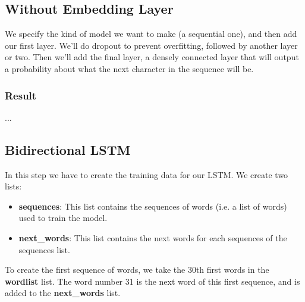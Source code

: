 \documentclass[conference]{IEEEtran}
\begin{document}
\subsection{Without Embedding Layer}

We specify the kind of model we want to make (a sequential one), and then add our first layer. We'll do dropout to prevent overfitting, followed by another layer or two. Then we'll add the final layer, a densely connected layer that will output a probability about what the next character in the sequence will be.

\subsubsection{Result}

...

\subsection{Bidirectional LSTM}

In this step  we have to create the training data for our LSTM. We create two lists:

\begin{itemize}
\item \textbf{sequences}: This list contains the sequences of words (i.e. a list of words) used to train the model.
\item \textbf{next\_words}: This list contains the next words for each sequences of the sequences list.
\end{itemize}

To create the first sequence of words, we take the 30th first words in the \textbf{wordlist} list. The word number 31 is the next word of this first sequence, and is added to the \textbf{next\_words} list.

\end{document}
